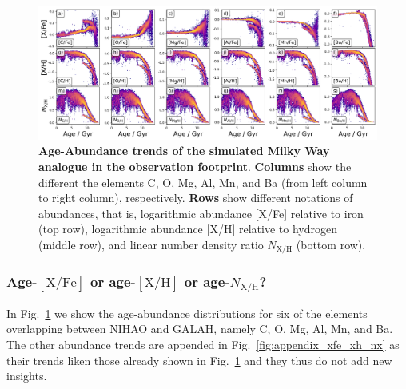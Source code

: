 \documentclass[fleqn,usenatbib]{mnras}
\begin{document}
\begin{figure}
	\includegraphics[width=\textwidth]{figures/age_xfe_xh_nxh.png}
    \caption{
    \textbf{Age-Abundance trends of the simulated Milky Way analogue in the observation footprint}.
    \textbf{Columns} show the different the elements C, O, Mg, Al, Mn, and Ba (from left column to right column), respectively.
    \textbf{Rows} show different notations of abundances, that is, logarithmic abundance {[X/Fe]} relative to iron (top row), logarithmic abundance {[X/H]} relative to hydrogen (middle row), and linear number density ratio {$N_\mathrm{X/H}$} (bottom row).
    }
    \label{fig:age_xfe_xh_nxh}
\end{figure}

\subsubsection{Age-{$\mathrm{[X/Fe]}$} or age-{$\mathrm{[X/H]}$} or age-{$N_\mathrm{X/H}$?}} \label{sec:age_xfe_xh_nxh}

In Fig.~\ref{fig:age_xfe_xh_nxh} we show the age-abundance distributions for six of the elements overlapping between NIHAO and GALAH, namely C, O, Mg, Al, Mn, and Ba. The other abundance trends are appended in Fig.~\ref{fig:appendix_xfe_xh_nx} as their trends liken those already shown in Fig.~\ref{fig:age_xfe_xh_nxh} and they thus do not add new insights.
\end{document}
